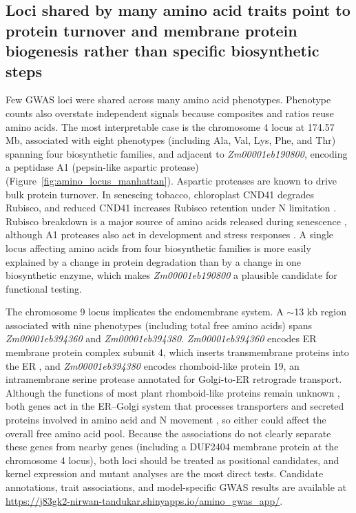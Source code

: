 \documentclass[namedate,unnumsec,webpdf,contemporary,large]{oup-authoring-template}
\begin{document}
\subsection{Loci shared by many amino acid traits point to protein turnover and membrane protein biogenesis rather than specific biosynthetic steps}

Few GWAS loci were shared across many amino acid phenotypes. Phenotype counts also overstate independent signals because composites and ratios reuse amino acids. The most interpretable case is the chromosome 4 locus at 174.57 Mb, associated with eight phenotypes (including Ala, Val, Lys, Phe, and Thr) spanning four biosynthetic families, and adjacent to \textit{Zm00001eb190800}, encoding a peptidase A1 (pepsin-like aspartic protease) (Figure~\ref{fig:amino_locus_manhattan}). Aspartic proteases are known to drive bulk protein turnover. In senescing tobacco, chloroplast CND41 degrades Rubisco, and reduced CND41 increases Rubisco retention under N limitation \citep{Kato2004CND41}. Rubisco breakdown is a major source of amino acids released during senescence \citep{Feller2008Rubiscolytics}, although A1 proteases also act in development and stress responses \citep{Soares2019AtypicalAP}. A single locus affecting amino acids from four biosynthetic families is more easily explained by a change in protein degradation than by a change in one biosynthetic enzyme, which makes \textit{Zm00001eb190800} a plausible candidate for functional testing.

The chromosome 9 locus implicates the endomembrane system. A $\sim$13 kb region associated with nine phenotypes (including total free amino acids) spans \textit{Zm00001eb394360} and \textit{Zm00001eb394380}. \textit{Zm00001eb394360} encodes ER membrane protein complex subunit 4, which inserts transmembrane proteins into the ER \citep{Guna2018EMC}, and \textit{Zm00001eb394380} encodes rhomboid-like protein 19, an intramembrane serine protease annotated for Golgi-to-ER retrograde transport. Although the functions of most plant rhomboid-like proteins remain unknown \citep{Lavell2021RBL10}, both genes act in the ER--Golgi system that processes transporters and secreted proteins involved in amino acid and N movement \citep{Brandizzi2018ERGolgi}, so either could affect the overall free amino acid pool. Because the associations do not clearly separate these genes from nearby genes (including a DUF2404 membrane protein at the chromosome 4 locus), both loci should be treated as positional candidates, and kernel expression and mutant analyses are the most direct tests. Candidate annotations, trait associations, and model-specific GWAS results are available at \url{https://j83gk2-nirwan-tandukar.shinyapps.io/amino_gwas_app/}.
\end{document}
